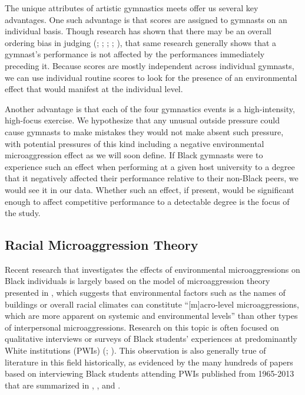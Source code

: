 \documentclass[12pt]{article}
\begin{document}
The unique attributes of artistic gymnastics meets offer us several key advantages. One such advantage is that scores are assigned to gymnasts on an individual basis. Though research has shown that there may be an overall ordering bias in judging (\citealp{damisch_mussweiler_plessner_2006}; \citealp{morgan_rotthoff_2014}; \citealp{rotthoff_2015}; \citealp{joustra_koning_krumer_2020}; \citealp{rotthoff_2020}), that same research generally shows that a gymnast's performance is not affected by the performances immediately preceding it. Because scores are mostly independent across individual gymnasts, we can use individual routine scores to look for the presence of an environmental effect that would manifest at the individual level.

Another advantage is that each of the four gymnastics events is a high-intensity, high-focus exercise. We hypothesize that any unusual outside pressure could cause gymnasts to make mistakes they would not make absent such pressure, with potential pressures of this kind including a negative environmental microaggression effect as we will soon define. If Black gymnasts were to experience such an effect when performing at a given host university to a degree that it negatively affected their performance relative to their non-Black peers, we would see it in our data. Whether such an effect, if present, would be significant enough to affect competitive performance to a detectable degree is the focus of the study.


\subsection{Racial Microaggression Theory}
Recent research that investigates the effects of environmental microaggressions on Black individuals is largely based on the model of microaggression theory presented in \citet{microagressions_2007}, which suggests that environmental factors such as the names of buildings or overall racial climates can constitute “[m]acro-level microaggressions, which are more apparent on systemic and environmental levels” than other types of interpersonal microaggressions. Research on this topic is often focused on qualitative interviews or surveys of Black students’ experiences at predominantly White institutions (PWIs) (\citealp{mills_2020}; \citealp{holliday_squires_2020}). This observation is also generally true of literature in this field historically, as evidenced by the many hundreds of papers based on interviewing Black students attending PWIs published from 1965-2013 that are summarized in \cite{willie_cunnigen_1981}, \cite{sedlacek_1987}, and \cite{holliday_squires_2020}. 
\end{document}
